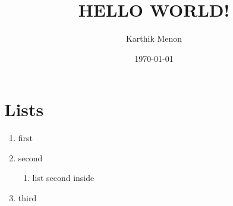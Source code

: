 \documentclass[a4paper,12pt]{article}
\begin{document}
\title{HELLO WORLD!}
\author{Karthik Menon}
\date{\today}
\maketitle
\newpage
\newpage
\section{Lists}
\begin{enumerate}
	\item first
	\item second
	\begin{enumerate}
		\item list second inside
	\end{enumerate}
	\item third
\end{enumerate}
\end{document}

